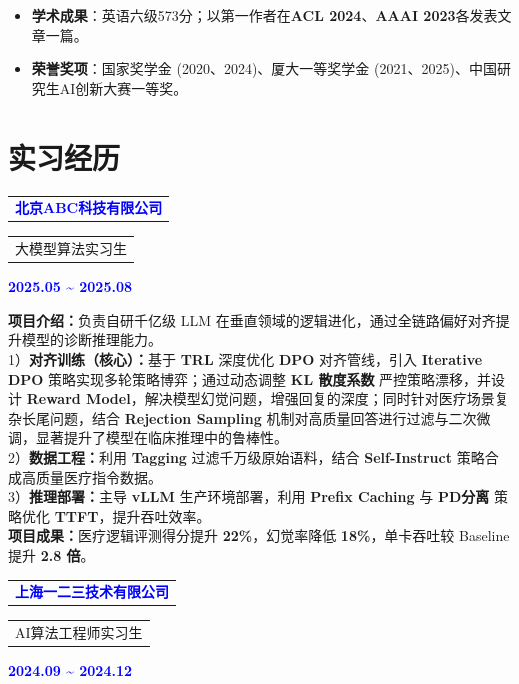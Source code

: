 \documentclass[10.5pt, a4paper]{ctexart}
\begin{document}
\begin{itemize}
    \item \textbf{学术成果}：英语六级573分；以第一作者在\textbf{ACL 2024}、\textbf{AAAI 2023}各发表文章一篇。
    \item \textbf{荣誉奖项}：国家奖学金 (2020、2024)、厦大一等奖学金 (2021、2025)、中国研究生AI创新大赛一等奖。
\end{itemize}

\section*{实习经历}
\vspace{-0.5em}

\noindent
\begin{tabular}{@{}p{8cm}@{}}
    \textcolor{blue}{\textbf{北京ABC科技有限公司}}
\end{tabular}
\begin{tabular}{@{}p{6cm}@{}}
    大模型算法实习生
\end{tabular}
\hfill\textcolor{blue}{\textbf{2025.05 \textasciitilde{} 2025.08}}

\par\noindent
\textbf{项目介绍：}负责自研千亿级 LLM 在垂直领域的逻辑进化，通过全链路偏好对齐提升模型的诊断推理能力。 \\
1）\textbf{对齐训练（核心）：}基于 \textbf{TRL} 深度优化 \textbf{DPO} 对齐管线，引入 \textbf{Iterative DPO} 策略实现多轮策略博弈；通过动态调整 \textbf{KL 散度系数} 严控策略漂移，并设计 \textbf{Reward Model}，解决模型幻觉问题，增强回复的深度；同时针对医疗场景复杂长尾问题，结合 \textbf{Rejection Sampling} 机制对高质量回答进行过滤与二次微调，显著提升了模型在临床推理中的鲁棒性。 \\
2）\textbf{数据工程：}利用 \textbf{Tagging} 过滤千万级原始语料，结合 \textbf{Self-Instruct} 策略合成高质量医疗指令数据。 \\
3）\textbf{推理部署：}主导 \textbf{vLLM} 生产环境部署，利用 \textbf{Prefix Caching} 与 \textbf{PD分离} 策略优化 \textbf{TTFT}，提升吞吐效率。 \\
\textbf{项目成果：}医疗逻辑评测得分提升 \textbf{22\%}，幻觉率降低 \textbf{18\%}，单卡吞吐较 Baseline 提升 \textbf{2.8 倍}。

\noindent
\begin{tabular}{@{}p{8cm}@{}}
    \textcolor{blue}{\textbf{上海一二三技术有限公司}}
\end{tabular}
\begin{tabular}{@{}p{6cm}@{}}
    AI算法工程师实习生
\end{tabular}
\hfill\textcolor{blue}{\textbf{2024.09 \textasciitilde{} 2024.12}}
\end{document}
